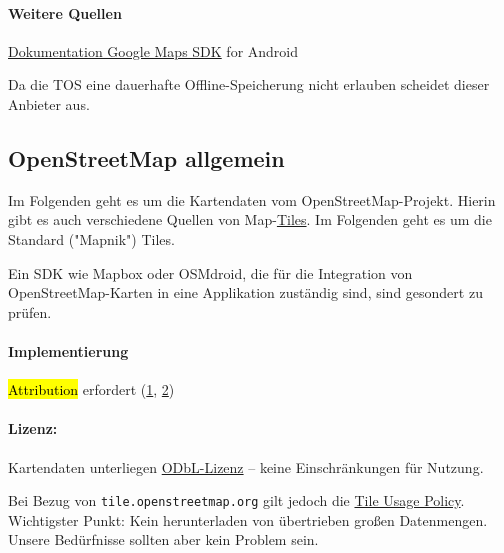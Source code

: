 \documentclass[11pt]{article} %
\begin{document}
 \paragraph{Weitere Quellen}
 \begin{cptitemize} 
   	 \item \href{https://developers.google.com/maps/documentation/android-sdk/intro}{Dokumentation Google Maps SDK} for Android 
  \end{cptitemize}  

  Da die TOS eine dauerhafte Offline-Speicherung nicht erlauben scheidet dieser Anbieter aus.


\subsection{OpenStreetMap allgemein}

Im Folgenden geht es um die Kartendaten vom OpenStreetMap-Projekt. Hierin gibt es auch verschiedene Quellen von Map-\href{https://wiki.openstreetmap.org/wiki/Tiles}{Tiles}. Im Folgenden geht es um die Standard ("Mapnik") Tiles.

Ein SDK wie Mapbox oder OSMdroid, die für die Integration von OpenStreetMap-Karten in eine Applikation zuständig sind, sind gesondert zu prüfen.

\paragraph{Implementierung}
\begin{cptitemize} 
  	 \item \hl{Attribution} erfordert (\href{https://operations.osmfoundation.org/policies/tiles/}{1},  \href{https://operations.osmfoundation.org/policies/tiles/}{2}) 
 \end{cptitemize}  

 \paragraph{Lizenz:} 
 \begin{cptitemize} 
  	 \item Kartendaten unterliegen \href{https://opendatacommons.org/licenses/odbl/summary/}{ODbL-Lizenz} -- keine Einschränkungen für Nutzung.
  	 \item  Bei Bezug von \lstinline$tile.openstreetmap.org$ gilt jedoch die \href{https://operations.osmfoundation.org/policies/tiles/}{Tile Usage Policy}. Wichtigster Punkt: Kein herunterladen von übertrieben großen Datenmengen. Unsere Bedürfnisse sollten aber kein Problem sein.
 \end{cptitemize} 
\end{document}
